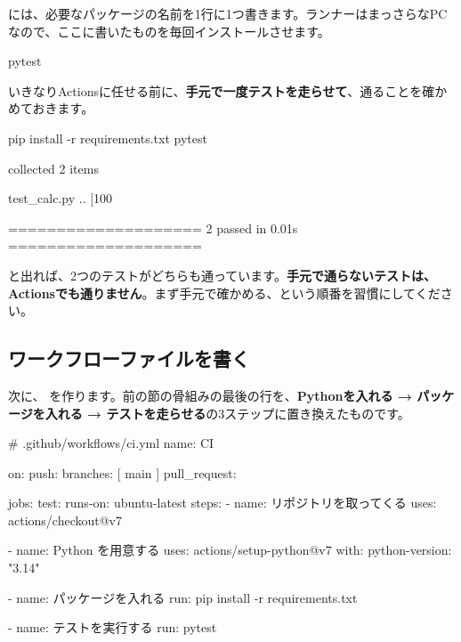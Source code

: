  には、必要なパッケージの名前を1行に1つ書きます。ランナーはまっさらなPCなので、ここに書いたものを毎回インストールさせます。

\begin{codebox}[text]
\begin{code}
pytest
\end{code}
\end{codebox}

いきなりActionsに任せる前に、\textbf{手元で一度テストを走らせて}、通ることを確かめておきます。

\begin{codebox}[bash]
\begin{code}
pip install -r requirements.txt
pytest
\end{code}
\end{codebox}

\begin{codebox}[text]
\begin{code}
collected 2 items

test_calc.py ..                                    [100%

==================== 2 passed in 0.01s ====================
\end{code}
\end{codebox}

 と出れば、2つのテストがどちらも通っています。\textbf{手元で通らないテストは、Actionsでも通りません}。まず手元で確かめる、という順番を習慣にしてください。

\subsection{ワークフローファイルを書く}

次に、 を作ります。前の節の骨組みの最後の行を、\textbf{Pythonを入れる → パッケージを入れる → テストを走らせる}の3ステップに置き換えたものです。

\begin{codebox}[yaml]
\begin{code}
# .github/workflows/ci.yml
name: CI

on:
  push:
    branches: [ main ]
  pull_request:

jobs:
  test:
    runs-on: ubuntu-latest
    steps:
      - name: リポジトリを取ってくる
        uses: actions/checkout@v7

      - name: Python を用意する
        uses: actions/setup-python@v7
        with:
          python-version: "3.14"

      - name: パッケージを入れる
        run: pip install -r requirements.txt

      - name: テストを実行する
        run: pytest
\end{code}
\end{codebox}

